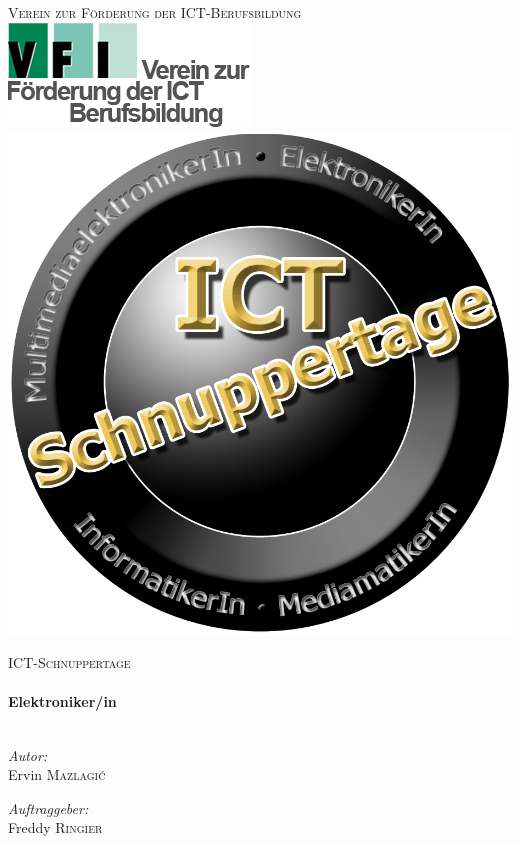 \begin{titlepage}

\begin{center}



\textsc{\LARGE Verein zur Förderung der ICT-Berufsbildung}\\[2cm]

\includegraphics[scale=0.5]{../pictures/vfi-logo.png}
\vfill
\includegraphics[scale=0.4]{../pictures/ict-logo.png}
\vfill

\textsc{\Large ICT-Schnuppertage}\\[0.5cm]

\HRule \\[0.4cm]
{ \huge \bfseries Elektroniker/in}\\[0.4cm]

\HRule \\[1.5cm]

\begin{minipage}{0.4\textwidth}
\begin{flushleft} \large
\emph{Autor:}\\
Ervin \textsc{Mazlagi\'c}
\end{flushleft}
\end{minipage}
\hfill
\begin{minipage}{0.4\textwidth}
\begin{flushright} \large
\emph{Auftraggeber:} \\
Freddy \textsc{Ringier}
\end{flushright}
\end{minipage}


\end{center}
\end{titlepage}
